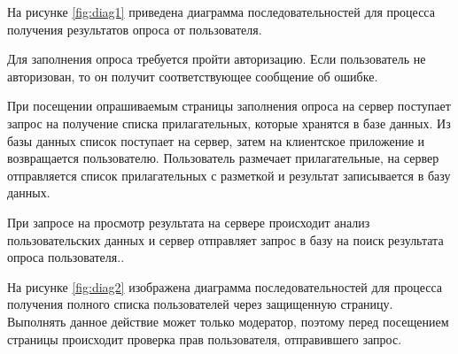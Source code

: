 На рисунке \ref{fig:diag1} приведена диаграмма последовательностей для процесса получения результатов опроса от пользователя.

Для заполнения опроса требуется пройти авторизацию. Если пользователь не авторизован, то он получит соответствующее сообщение об ошибке.

При посещении опрашиваемым страницы заполнения опроса на сервер поступает запрос на получение списка прилагательных, которые хранятся в базе данных. Из базы данных список поступает на сервер, затем на клиентское приложение и возвращается пользователю. Пользователь размечает прилагательные, на сервер отправляется список прилагательных с разметкой и результат записывается в базу данных. 

При запросе на просмотр результата на сервере происходит анализ пользовательских данных и сервер отправляет запрос в базу на поиск результата опроса пользователя..

На рисунке \ref{fig:diag2} изображена диаграмма последовательностей для процесса получения полного списка пользователей через защищенную страницу. Выполнять данное действие может только модератор, поэтому перед посещением страницы происходит проверка прав пользователя, отправившего запрос. 

